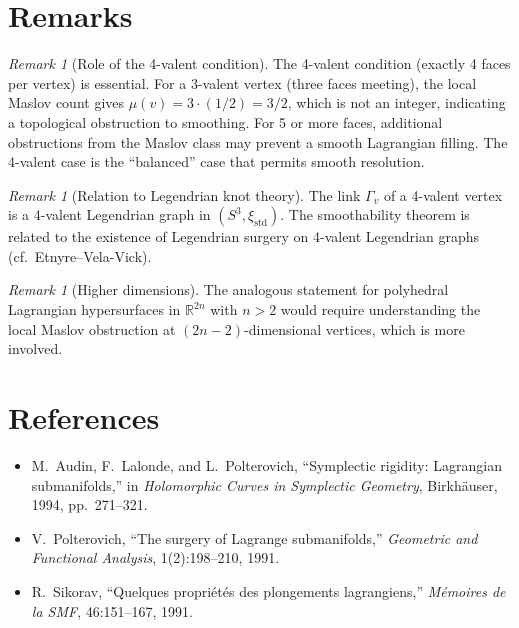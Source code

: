 \documentclass[12pt]{article}
\theoremstyle{definition}
\theoremstyle{remark}
\newtheorem{remark}[theorem]{Remark}
\newcommand{\bR}{\mathbb{R}}
\begin{document}
\section{Remarks}

\begin{remark}[Role of the 4-valent condition]
The 4-valent condition (exactly 4 faces per vertex) is essential.  For a
3-valent vertex (three faces meeting), the local Maslov count gives
$\mu(v) = 3\cdot(1/2) = 3/2$, which is not an integer, indicating a
topological obstruction to smoothing.  For 5 or more faces, additional
obstructions from the Maslov class may prevent a smooth Lagrangian filling.
The 4-valent case is the ``balanced'' case that permits smooth resolution.
\end{remark}

\begin{remark}[Relation to Legendrian knot theory]
The link $\Gamma_v$ of a 4-valent vertex is a 4-valent Legendrian graph in
$(S^3,\xi_{\mathrm{std}})$.  The smoothability theorem is related to the
existence of Legendrian surgery on 4-valent Legendrian graphs (cf.\ Etnyre--Vela-Vick).
\end{remark}

\begin{remark}[Higher dimensions]
The analogous statement for polyhedral Lagrangian hypersurfaces in $\bR^{2n}$
with $n>2$ would require understanding the local Maslov obstruction at
$(2n-2)$-dimensional vertices, which is more involved.
\end{remark}

\section*{References}

\begin{itemize}
\item M.~Audin, F.~Lalonde, and L.~Polterovich, ``Symplectic rigidity:
  Lagrangian submanifolds,'' in \emph{Holomorphic Curves in Symplectic
  Geometry}, Birkh\"auser, 1994, pp.\ 271--321.
\item V.~Polterovich, ``The surgery of Lagrange submanifolds,''
  \emph{Geometric and Functional Analysis}, 1(2):198--210, 1991.
\item R.~Sikorav, ``Quelques propriétés des plongements lagrangiens,''
  \emph{Mémoires de la SMF}, 46:151--167, 1991.
\end{itemize}
\end{document}
